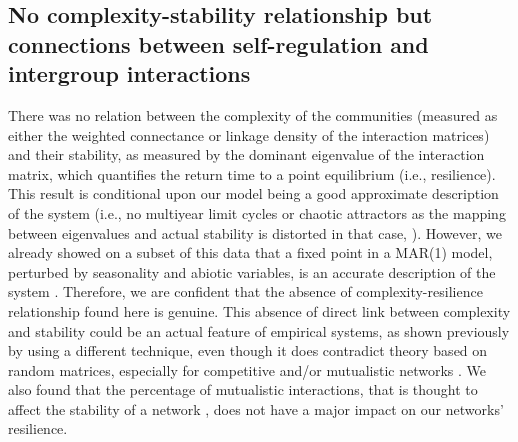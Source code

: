 \documentclass[10pt]{article}
\begin{document}
\subsection*{No complexity-stability relationship but connections between self-regulation and intergroup interactions}

There was no relation between the complexity of the communities (measured
as either the weighted connectance or linkage density of the interaction
matrices) and their stability, as measured by the dominant eigenvalue
of the interaction matrix, which quantifies the return time to a point
equilibrium (i.e., resilience). This result is conditional upon our
model being a good approximate description of the system (i.e., no
multiyear limit cycles or chaotic attractors as the mapping between
eigenvalues and actual stability is distorted in that case, \citealp{certain_how_2018}).
However, we already showed on a subset of this data that a fixed point
in a MAR(1) model, perturbed by seasonality and abiotic variables,
is an accurate description of the system \citep{barraquand_coastal_2018}.
Therefore, we are confident that the absence of complexity-resilience relationship
found here is genuine. This absence of direct link between complexity
and stability could be an actual feature of empirical systems, as
shown previously by \citet{jacquet_no_2016} using a different technique,
even though it does contradict theory
based on random matrices, especially for competitive and/or mutualistic
networks \citep{allesina_stability_2012}. We also found that the
percentage of mutualistic interactions, that is thought to affect
the stability of a network \citep{mougi2012diversity,coyte_ecology_2015,garcia-callejas_multiple_2018},
does not have a major impact on our networks' resilience.
\end{document}
